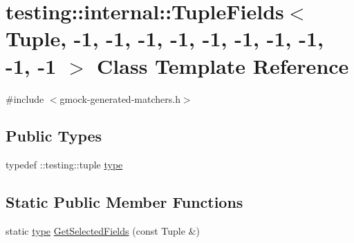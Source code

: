 \hypertarget{classtesting_1_1internal_1_1_tuple_fields_3_01_tuple_00_01-1_00_01-1_00_01-1_00_01-1_00_01-1_00_c541d4fe72f9dece2f1a50ee33bb16df}{}\section{testing\+:\+:internal\+:\+:Tuple\+Fields$<$ Tuple, -\/1, -\/1, -\/1, -\/1, -\/1, -\/1, -\/1, -\/1, -\/1, -\/1 $>$ Class Template Reference}
\label{classtesting_1_1internal_1_1_tuple_fields_3_01_tuple_00_01-1_00_01-1_00_01-1_00_01-1_00_01-1_00_c541d4fe72f9dece2f1a50ee33bb16df}


{\ttfamily \#include $<$gmock-\/generated-\/matchers.\+h$>$}

\subsection*{Public Types}
\begin{DoxyCompactItemize}
\item 
typedef \+::testing\+::tuple \hyperlink{classtesting_1_1internal_1_1_tuple_fields_3_01_tuple_00_01-1_00_01-1_00_01-1_00_01-1_00_01-1_00_c541d4fe72f9dece2f1a50ee33bb16df_a853fa65a18c6b392327ae2cf59bc9571}{type}
\end{DoxyCompactItemize}
\subsection*{Static Public Member Functions}
\begin{DoxyCompactItemize}
\item 
static \hyperlink{classtesting_1_1internal_1_1_tuple_fields_3_01_tuple_00_01-1_00_01-1_00_01-1_00_01-1_00_01-1_00_c541d4fe72f9dece2f1a50ee33bb16df_a853fa65a18c6b392327ae2cf59bc9571}{type} \hyperlink{classtesting_1_1internal_1_1_tuple_fields_3_01_tuple_00_01-1_00_01-1_00_01-1_00_01-1_00_01-1_00_c541d4fe72f9dece2f1a50ee33bb16df_a50c35eab642d04560d5a412cd10246ce}{Get\+Selected\+Fields} (const Tuple \&)
\end{DoxyCompactItemize}


